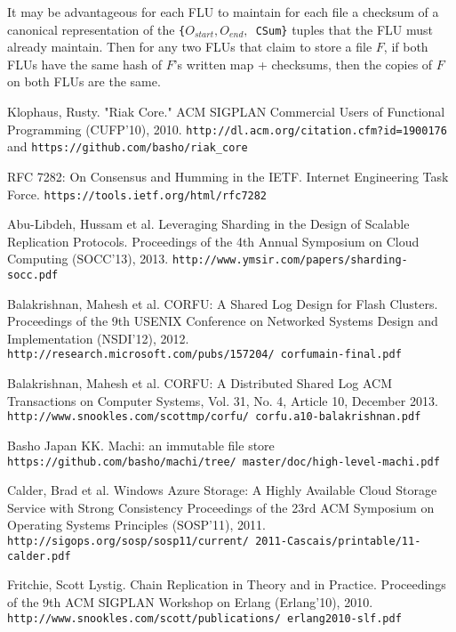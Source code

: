 \documentclass[preprint,10pt]{sigplanconf}
\begin{document}
It may be advantageous for each FLU to maintain for each file a
checksum of a canonical representation of the
{\tt \{$O_{start},O_{end},$ CSum\}} tuples that the FLU must already
maintain.  Then for any two FLUs that claim to store a file $F$, if
both FLUs have the same hash of $F$'s written map + checksums, then
the copies of $F$ on both FLUs are the same.


\begin{thebibliography}{}
\softraggedright

Klophaus, Rusty.
"Riak Core."
ACM SIGPLAN Commercial Users of Functional Programming (CUFP'10), 2010.
{\tt http://dl.acm.org/citation.cfm?id=1900176} and
{\tt https://github.com/basho/riak\_core}

RFC 7282: On Consensus and Humming in the IETF.
Internet Engineering Task Force.
{\tt https://tools.ietf.org/html/rfc7282}

Abu-Libdeh, Hussam et al.
Leveraging Sharding in the Design of Scalable Replication Protocols.
Proceedings of the 4th Annual Symposium on Cloud Computing (SOCC'13), 2013.
{\tt http://www.ymsir.com/papers/sharding-socc.pdf}

Balakrishnan, Mahesh et al.
CORFU: A Shared Log Design for Flash Clusters.
Proceedings of the 9th USENIX Conference on Networked Systems Design
and Implementation (NSDI'12), 2012.
{\tt http://research.microsoft.com/pubs/157204/ corfumain-final.pdf}

Balakrishnan, Mahesh et al.
CORFU: A Distributed Shared Log
ACM Transactions on Computer Systems, Vol. 31, No. 4, Article 10, December 2013.
{\tt http://www.snookles.com/scottmp/corfu/ corfu.a10-balakrishnan.pdf}

Basho Japan KK.
Machi: an immutable file store
{\tt https://github.com/basho/machi/tree/ master/doc/high-level-machi.pdf}

Calder, Brad et al.
Windows Azure Storage: A Highly Available Cloud Storage Service with Strong Consistency
Proceedings of the 23rd ACM Symposium on Operating Systems Principles (SOSP'11), 2011.
{\tt http://sigops.org/sosp/sosp11/current/ 2011-Cascais/printable/11-calder.pdf}

Fritchie, Scott Lystig.
Chain Replication in Theory and in Practice.
Proceedings of the 9th ACM SIGPLAN Workshop on Erlang (Erlang'10), 2010.
{\tt http://www.snookles.com/scott/publications/ erlang2010-slf.pdf}


\end{thebibliography}
\end{document}
